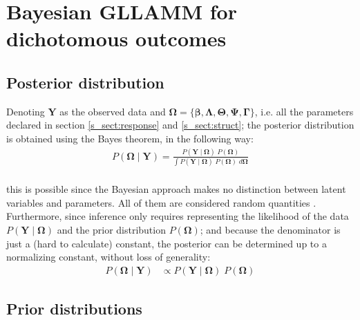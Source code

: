 
\section{Bayesian GLLAMM for dichotomous outcomes} \label{sect:model}

\subsection{Posterior distribution}

Denoting $\mathbf{Y}$ as the observed data and $\pmb{\Omega} = \{ \pmb{\beta}, \pmb{\Lambda}, \pmb{\Theta}, \pmb{\Psi}, \pmb{\Gamma} \}$, i.e. all the parameters declared in section \ref{s_sect:response} and \ref{s_sect:struct}; the posterior distribution is obtained using the Bayes theorem, in the following way:
%
\begin{equation} \label{eq:posterior1}
	\begin{split}
		P(\pmb{\Omega} \; | \; \mathbf{Y}) = \frac{ P( \mathbf{Y} \; | \; \pmb{\Omega} ) \; P( \pmb{\Omega} ) }{ \int P( \mathbf{Y} \; | \; \pmb{\Omega} ) \; P( \pmb{\Omega} ) \; d\pmb{\Omega} } \\
	\end{split}
\end{equation}

\noindent this is possible since the Bayesian approach makes no distinction between latent variables and parameters. All of them are considered random quantities \cite{Skrondal_et_al_2004a}. Furthermore, since inference only requires representing the likelihood of the data $P( \mathbf{Y} \; | \; \pmb{\Omega} )$ and the prior distribution $P( \pmb{\Omega} )$; and because the denominator is just a (hard to calculate) constant, the posterior can be determined up to a normalizing constant, without loss of generality:
%
\begin{equation} \label{eq:posterior2}
	\begin{split}
		P(\pmb{\Omega} \; | \; \mathbf{Y}) &\propto P( \mathbf{Y} \; | \; \pmb{\Omega} ) \; P( \pmb{\Omega} )
	\end{split}
\end{equation}


\subsection{Prior distributions}

